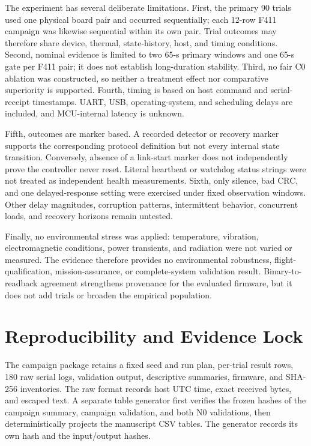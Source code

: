 \documentclass[conference]{IEEEtran}
\begin{document}
The experiment has several deliberate limitations. First, the primary 90 trials used one physical board pair and occurred sequentially; each 12-row F411 campaign was likewise sequential within its own pair. Trial outcomes may therefore share device, thermal, state-history, host, and timing conditions. Second, nominal evidence is limited to two 65-s primary windows and one 65-s gate per F411 pair; it does not establish long-duration stability. Third, no fair C0 ablation was constructed, so neither a treatment effect nor comparative superiority is supported. Fourth, timing is based on host command and serial-receipt timestamps. UART, USB, operating-system, and scheduling delays are included, and MCU-internal latency is unknown.

Fifth, outcomes are marker based. A recorded detector or recovery marker supports the corresponding protocol definition but not every internal state transition. Conversely, absence of a link-start marker does not independently prove the controller never reset. Literal heartbeat or watchdog status strings were not treated as independent health measurements. Sixth, only silence, bad CRC, and one delayed-response setting were exercised under fixed observation windows. Other delay magnitudes, corruption patterns, intermittent behavior, concurrent loads, and recovery horizons remain untested.

Finally, no environmental stress was applied: temperature, vibration, electromagnetic conditions, power transients, and radiation were not varied or measured. The evidence therefore provides no environmental robustness, flight-qualification, mission-assurance, or complete-system validation result. Binary-to-readback agreement strengthens provenance for the evaluated firmware, but it does not add trials or broaden the empirical population.

\section{Reproducibility and Evidence Lock}

The campaign package retains a fixed seed and run plan, per-trial result rows, 180 raw serial logs, validation output, descriptive summaries, firmware, and SHA-256 inventories. The raw format records host UTC time, exact received bytes, and escaped text. A separate table generator first verifies the frozen hashes of the campaign summary, campaign validation, and both N0 validations, then deterministically projects the manuscript CSV tables. The generator records its own hash and the input/output hashes.
\end{document}
